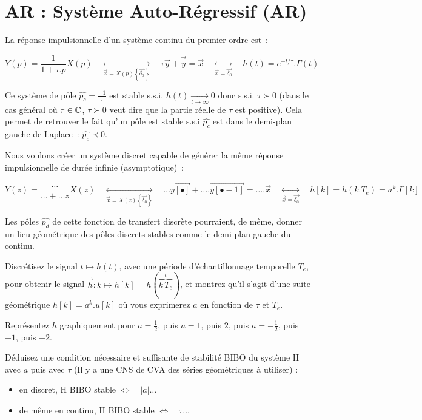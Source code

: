 \section{AR : Système Auto-Régressif (AR)} 

La réponse impulsionnelle d'un système continu du premier ordre est~:

$$ Y(p) = \frac{1}{1+\tau. p} X(p) \quad \underset{\vec{x}=X(p)\left\{\vec{\delta_0}\right\}}{\longleftrightarrow} \quad \tau \vec{y} + \vec{\dot{y}} = \vec{x}\quad \underset{\vec{x}=\vec{\delta_0}}{\longleftrightarrow} \quad h(t) = e^{-t/\tau}.\Gamma(t)$$

Ce système de pôle $\widehat{p_c}=\frac{-1}{\tau}$ est stable s.s.i.
$h(t) \underset{t\to \infty}{\rightarrow} 0$ donc s.s.i. $\tau\succ 0$
(dans le cas général où $\tau \in \mathbb{C}$, $\tau\succ 0$ veut dire que la
partie réelle de $\tau$ est positive). Cela permet de retrouver le
fait qu'un pôle est stable s.s.i $\widehat{p_c}$ est dans le demi-plan gauche de
Laplace~: $\widehat{p_c}\prec 0$.


Nous voulons créer un système discret capable de
générer la même réponse impulsionnelle de durée infinie (asymptotique)~:

$$Y(z) = \frac{\dots}{\dots +\dots z} X(z) \quad \underset{\vec{x}=X(z)\left\{\vec{\delta_0}\right\}}{\longleftrightarrow} \quad  \dots \vec{y[\bullet]} + \dots. \vec{y[\bullet-1]} = \dots . \vec{x}\quad \underset{\vec{x}=\vec{\delta_0}}{\longleftrightarrow} \quad h[k] = h\left(k.T_e\right) = a^k.\Gamma[k]$$

Les pôles $\widehat{p_d}$ de cette fonction de transfert discrète pourraient, de même, donner un lieu géométrique des pôles discrets stables comme le demi-plan gauche du continu.

 Discrétisez le signal $t\mapsto h(t)$, avec une période
d'échantillonnage temporelle $T_e$, pour obtenir le signal
$\vec{h} : k \mapsto h[k]=h(\overbrace{k\,T_e}^{t})$, et montrez qu'il
s'agit d'une suite géométrique $h[k]=a^k.u[k]$ où vous exprimerez $a$
en fonction de $\tau$ et $T_e$.

Représentez $h$ graphiquement pour $a=\frac{1}{2}$, puis $a=1$, puis
$2$, puis $a=-\frac{1}{2}$, puis $-1$, puis $-2$.

Déduisez une condition nécessaire et suffisante de stabilité BIBO du système H avec $a$ puis avec $\tau$ (Il y a une CNS de CVA des séries géométriques à utiliser) : 
\begin{itemize}
\item en discret, H BIBO stable $\iff \quad |a| \ldots $
\item de même en continu, H BIBO stable $\iff \quad \tau \ldots$  
\end{itemize}

